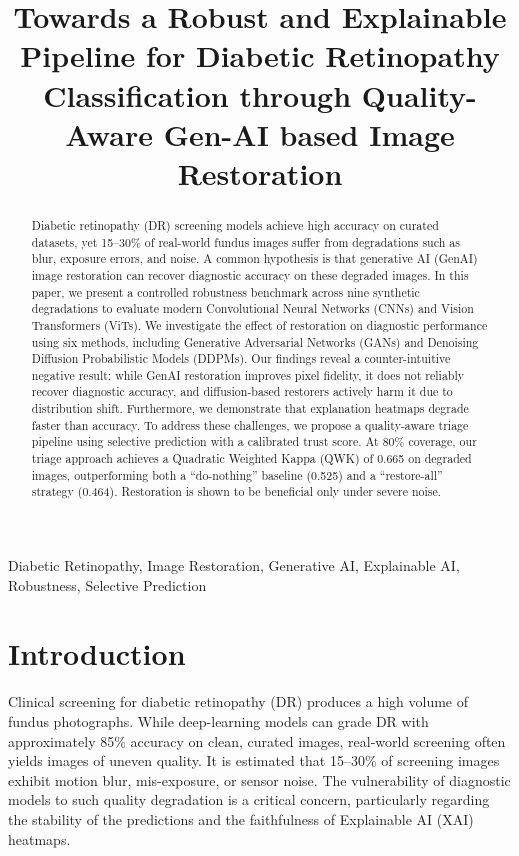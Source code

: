 \documentclass[conference]{IEEEtran}
\begin{document}
\title{Towards a Robust and Explainable Pipeline for Diabetic Retinopathy Classification through Quality-Aware Gen-AI based Image Restoration}

\author{
}

\maketitle

\begin{abstract}
Diabetic retinopathy (DR) screening models achieve high accuracy on curated datasets, yet 15--30\% of real-world fundus images suffer from degradations such as blur, exposure errors, and noise. A common hypothesis is that generative AI (GenAI) image restoration can recover diagnostic accuracy on these degraded images. In this paper, we present a controlled robustness benchmark across nine synthetic degradations to evaluate modern Convolutional Neural Networks (CNNs) and Vision Transformers (ViTs). We investigate the effect of restoration on diagnostic performance using six methods, including Generative Adversarial Networks (GANs) and Denoising Diffusion Probabilistic Models (DDPMs). Our findings reveal a counter-intuitive negative result: while GenAI restoration improves pixel fidelity, it does not reliably recover diagnostic accuracy, and diffusion-based restorers actively harm it due to distribution shift. Furthermore, we demonstrate that explanation heatmaps degrade faster than accuracy. To address these challenges, we propose a quality-aware triage pipeline using selective prediction with a calibrated trust score. At 80\% coverage, our triage approach achieves a Quadratic Weighted Kappa (QWK) of 0.665 on degraded images, outperforming both a ``do-nothing'' baseline (0.525) and a ``restore-all'' strategy (0.464). Restoration is shown to be beneficial only under severe noise.
\end{abstract}

\begin{IEEEkeywords}
Diabetic Retinopathy, Image Restoration, Generative AI, Explainable AI, Robustness, Selective Prediction
\end{IEEEkeywords}

\section{Introduction}
Clinical screening for diabetic retinopathy (DR) produces a high volume of fundus photographs. While deep-learning models can grade DR with approximately 85\% accuracy on clean, curated images, real-world screening often yields images of uneven quality. It is estimated that 15--30\% of screening images exhibit motion blur, mis-exposure, or sensor noise. The vulnerability of diagnostic models to such quality degradation is a critical concern, particularly regarding the stability of the predictions and the faithfulness of Explainable AI (XAI) heatmaps.
\end{document}
